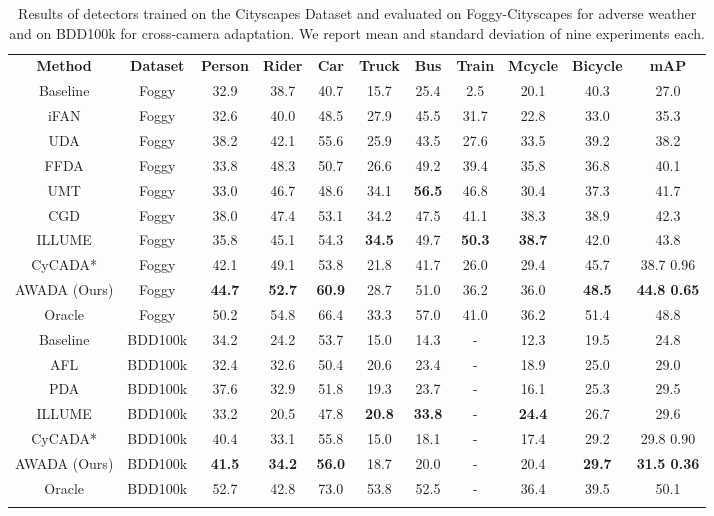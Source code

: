 \documentclass[10pt,twocolumn,letterpaper]{article}
\begin{document}
\begin{table*}[t]
	\centering
	\caption{Results of detectors trained on the Cityscapes Dataset and evaluated on Foggy-Cityscapes for adverse weather and on BDD100k for cross-camera adaptation. We report mean and standard deviation of nine experiments each.}
	\label{table:City2Foggy}
	\begin{tabular}{c|c|cccccccc|c}
		\specialrule{1.2pt}{1pt}{1pt}
		\textbf{Method} & \textbf{Dataset} &\textbf{Person} & \textbf{Rider}& \textbf{Car}& \textbf{Truck}& \textbf{Bus}& \textbf{Train}& \textbf{Mcycle}& \textbf{Bicycle}& \textbf{mAP}\\
		\specialrule{1.2pt}{1pt}{1pt}
		Baseline&Foggy&32.9&38.7&40.7&15.7&25.4&2.5&20.1&40.3&27.0\\
		\hline
		iFAN \cite{iFAN}&Foggy&32.6&40.0&48.5&27.9&45.5&31.7&22.8&33.0&35.3\\
		UDA \cite{UDA}& Foggy&38.2&42.1&55.6&25.9&43.5&27.6&33.5&39.2&38.2\\
		FFDA \cite{FFDA}&Foggy&33.8&48.3&50.7&26.6&49.2&39.4&35.8&36.8&40.1\\
		UMT \cite{UMT} & Foggy&33.0&46.7&48.6&34.1&\textbf{56.5}&46.8&30.4&37.3&41.7\\
		CGD \cite{li2021category}&Foggy&38.0&47.4&53.1&34.2&47.5&41.1&38.3&38.9&42.3\\
		ILLUME \cite{ILLUME}& Foggy &35.8&45.1&54.3&\textbf{34.5}&49.7&\textbf{50.3}&\textbf{38.7}&42.0&43.8\\
		CyCADA* \cite{menke2022}&Foggy&42.1&49.1&53.8&21.8&41.7&26.0&29.4&45.7&38.7  0.96  \\
		AWADA (Ours)&Foggy&\textbf{44.7}&\textbf{52.7}&\textbf{60.9}&28.7&51.0&36.2&36.0&\textbf{48.5}&\textbf{44.8  0.65}\\
		\hline
		Oracle&Foggy&50.2&54.8&66.4&33.3&57.0&41.0&36.2&51.4&48.8\\
		\specialrule{1.2pt}{1pt}{1pt}
		Baseline&BDD100k&34.2&24.2&53.7&15.0&14.3&-&12.3&19.5&24.8\\
		\hline
		AFL \cite{AFL} & BDD100k &32.4&32.6&50.4&20.6&23.4&-&18.9&25.0&29.0\\
		PDA \cite{ProgressiveDomainAdaptation}& BDD100k &37.6&32.9&51.8&19.3&23.7&-&16.1&25.3&29.5\\
		ILLUME \cite{ILLUME} & BDD100k &33.2&20.5&47.8&\textbf{20.8}&\textbf{33.8}&-&\textbf{24.4}&26.7&29.6\\
		CyCADA* \cite{menke2022}&BDD100k&40.4&33.1&55.8&15.0&18.1&-&17.4&29.2&29.8  0.90\\
		AWADA (Ours)&BDD100k&\textbf{41.5}&\textbf{34.2}&\textbf{56.0}&18.7&20.0&-&20.4&\textbf{29.7}&\textbf{31.5  0.36}\\
		\hline
		Oracle&BDD100k&52.7&42.8&73.0&53.8&52.5&-&36.4&39.5&50.1\\
		\specialrule{1.2pt}{1pt}{1pt}
	\end{tabular}
\end{table*}
\end{document}
